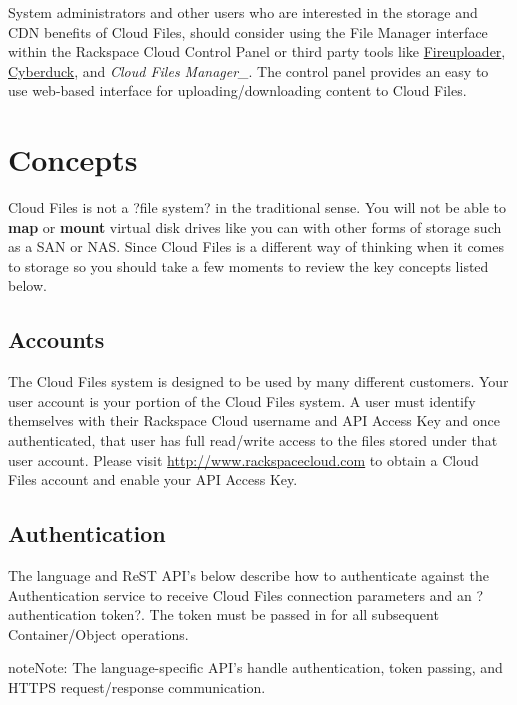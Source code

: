 \documentclass[letterpaper,10pt,english]{manual}
\begin{document}
System administrators and other users who are interested in the storage
and CDN benefits of Cloud Files, should consider using the File Manager
interface within the Rackspace Cloud Control Panel or third party tools
like \href{http://www.fireuploader.com/}{Fireuploader}, \href{http://www.cyberduck.ch/}{Cyberduck}, and \emph{Cloud Files Manager\_}.  The control
panel provides an easy to use web-based interface for uploading/downloading
content to Cloud Files.


\chapter{Concepts}

Cloud Files is not a ?file system? in the traditional sense. You will not
be able to \textbf{map} or \textbf{mount} virtual disk drives like you can with
other forms of storage such as a SAN or NAS. Since Cloud Files is a
different way of thinking when it comes to storage so you should take a
few moments to review the key concepts listed below.


\section{Accounts}

The Cloud Files system is designed to be used by many different customers.
Your user account is your portion of the Cloud Files system. A user must
identify themselves with their Rackspace Cloud username and API Access Key
and once authenticated, that user has full read/write access to the files
stored under that user account. Please visit \href{http://www.rackspacecloud.com}{http://www.rackspacecloud.com}
to obtain a Cloud Files account and enable your API Access Key.


\section{Authentication}

The language and ReST API's below describe how to authenticate against the
Authentication service to receive Cloud Files connection parameters and an
?authentication token?.  The token must be passed in for all subsequent
Container/Object operations.

\begin{notice}{note}{Note:}
The language-specific API's handle authentication, token passing,
and HTTPS request/response communication.
\end{notice}
\end{document}

